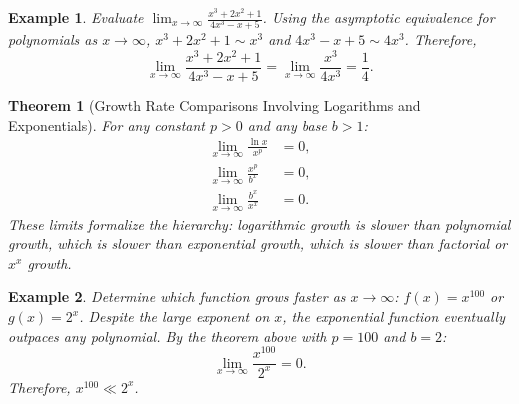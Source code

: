 \documentclass[11pt,a4paper]{article}
\newtheorem{example}{Example}
\newtheorem{theorem}{Theorem}
\begin{document}
\begin{example}
Evaluate $\displaystyle \lim_{x \to \infty} \frac{x^3 + 2x^2 + 1}{4x^3 - x + 5}$.
Using the asymptotic equivalence for polynomials as $x \to \infty$, $x^3 + 2x^2 + 1 \sim x^3$ and $4x^3 - x + 5 \sim 4x^3$. Therefore,
\[
\lim_{x \to \infty} \frac{x^3 + 2x^2 + 1}{4x^3 - x + 5} = \lim_{x \to \infty} \frac{x^3}{4x^3} = \frac{1}{4}.
\]
\end{example}
\begin{theorem}[Growth Rate Comparisons Involving Logarithms and Exponentials]
For any constant $p > 0$ and any base $b > 1$:
\begin{align*}
\lim_{x \to \infty} \frac{\ln x}{x^p} &= 0, \\
\lim_{x \to \infty} \frac{x^p}{b^x} &= 0, \\
\lim_{x \to \infty} \frac{b^x}{x^x} &= 0.
\end{align*}
These limits formalize the hierarchy: logarithmic growth is slower than polynomial growth, which is slower than exponential growth, which is slower than factorial or $x^x$ growth.
\end{theorem}
\begin{example}
Determine which function grows faster as $x \to \infty$: $f(x) = x^{100}$ or $g(x) = 2^x$.
Despite the large exponent on $x$, the exponential function eventually outpaces any polynomial. By the theorem above with $p = 100$ and $b = 2$:
\[
\lim_{x \to \infty} \frac{x^{100}}{2^x} = 0.
\]
Therefore, $x^{100} \ll 2^x$.
\end{example}
\end{document}
